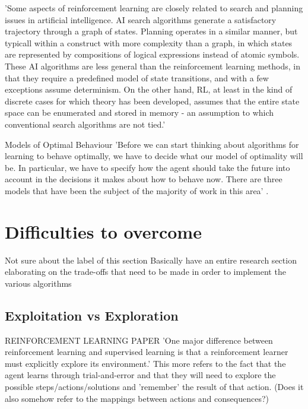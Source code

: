 'Some aspects of reinforcement learning are closely related to search and planning issues in artificial intelligence. AI search algorithms generate a satisfactory trajectory through a graph of states. Planning operates in a similar manner, but typicall within a construct with more complexity than a graph, in which states are represented by compositions of logical expressions instead of atomic symbols. These AI algorithms are less general than the reinforcement learning methods, in that they require a predefined model of state transitions, and with a few exceptions assume determinism. On the other hand, RL, at least in the kind of discrete cases for which theory has been developed, assumes that the entire state space can be enumerated and stored in memory - an assumption to which conventional search algorithms are not tied.' \cite{KaelblingLittmanMoore1996}

Models of Optimal Behaviour
'Before we can start thinking about algorithms for learning to behave optimally, we have to decide what our model of optimality will be. In particular, we have to specify how the agent should take the future into account in the decisions it makes about how to behave now. There are three models that have been the subject of the majority of work in this area' \cite{KaelblingLittmanMoore1996}.





\section{Difficulties to overcome}
Not sure about the label of this section
Basically have an entire research section elaborating on the trade-offs that need to be made in order to implement the various algorithms

\subsection{Exploitation vs Exploration} REINFORCEMENT LEARNING PAPER \cite{KaelblingLittmanMoore1996}
'One major difference between reinforcement learning and supervised learning is that a reinforcement learner must explicitly explore its environment.' \cite{KaelblingLittmanMoore1996}
This more refers to the fact that the agent learns through trial-and-error and that they will need to explore the possible steps/actions/solutions and 'remember' the result of that action. (Does it also somehow refer to the mappings between actions and consequences?)

